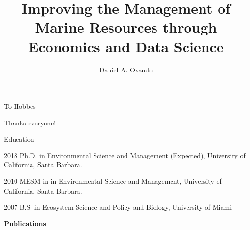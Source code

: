\documentclass[twoside,12pt,final]{ucthesis-CA2012}
\begin{document}
\begin{ucfrontmatter}


  \title{Improving the Management of Marine Resources through Economics and Data Science}

  \author{Daniel A. Ovando}

     


	\maketitle
	\approvalpage
	\copyrightpage

    \begin{dedication}

      \vspace*{25ex}
      \begin{center}
      \begin{Large}

        To Hobbes

      \end{Large}
      \end{center}
  \end{dedication}
  \begin{acknowledgements}
    Thanks everyone!
  \end{acknowledgements}
  \begin{vitae}
    \begin{vitaesection}{Education}
    \vspace{-0.1cm}
    \item [2018]	Ph.D. in Environmental Science and Management (Expected), University of California, Santa Barbara.
    \item [2010]	MESM in in Environmental Science and Management, University of California, Santa Barbara.
    \item [2007]	B.S. in Ecosystem Science and Policy and Biology, University of Miami
    \end{vitaesection}
    \textbf{Publications}


\end{vitae}
\end{ucfrontmatter}
\end{document}

